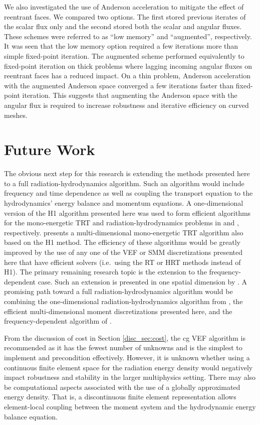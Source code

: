 \documentclass[../doc.tex]{subfiles}
\begin{document}
We also investigated the use of Anderson acceleration to mitigate the effect of reentrant faces. We compared two options. The first stored previous iterates of the scalar flux only and the second stored both the scalar and angular fluxes. These schemes were referred to as ``low memory'' and ``augmented'', respectively. It was seen that the low memory option required a few iterations more than simple fixed-point iteration. The augmented scheme performed equivalently to fixed-point iteration on thick problems where lagging incoming angular fluxes on reentrant faces has a reduced impact. On a thin problem, Anderson acceleration with the augmented Anderson space converged a few iterations faster than fixed-point iteration. This suggests that augmenting the Anderson space with the angular flux is required to increase robustness and iterative efficiency on curved meshes. 

\section{Future Work}
The obvious next step for this research is extending the methods presented here to a full radiation-hydrodynamics algorithm. Such an algorithm would include frequency and time dependence as well as coupling the transport equation to the hydrodynamics' energy balance and momentum equations. 
A one-dimensional version of the H1 algorithm presented here was used to form efficient algorithms for the mono-energetic TRT and radiation-hydrodynamics problems in \textcite{LOU2019258} and \textcite{LOU2021110393}, respectively. \textcite{yee_mc21} presents a multi-dimensional mono-energetic TRT algorithm also based on the H1 method. The efficiency of these algorithms would be greatly improved by the use of any one of the VEF or SMM discretizations presented here that have efficient solvers (i.e.~using the RT or HRT methods instead of H1). 
The primary remaining research topic is the extension to the frequency-dependent case. Such an extension is presented in one spatial dimension by \textcite{anistratov2020nonlinear}. A promising path toward a full radiation-hydrodynamics algorithm would be combining the one-dimensional radiation-hydrodynamics algorithm from \textcite{LOU2021110393}, the efficient multi-dimensional moment discretizations presented here, and the frequency-dependent algorithm of \textcite{anistratov2020nonlinear}. 

From the discussion of cost in Section \ref{disc_sec:cost}, the \gls{cg} VEF algorithm is recommended as it has the fewest number of unknowns and is the simplest to implement and precondition effectively. However, it is unknown whether using a continuous finite element space for the radiation energy density would negatively impact robustness and stability in the larger multiphysics setting. There may also be computational aspects associated with the use of a globally approximated energy density. That is, a discontinuous finite element representation allows element-local coupling between the moment system and the hydrodynamic energy balance equation. 
\end{document}
